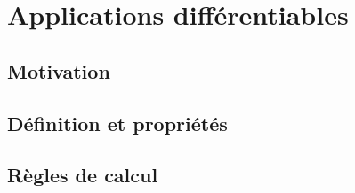 \chapter{Applications différentiables}

\section{Motivation}

\section{Définition et propriétés}

\section{Règles de calcul}


